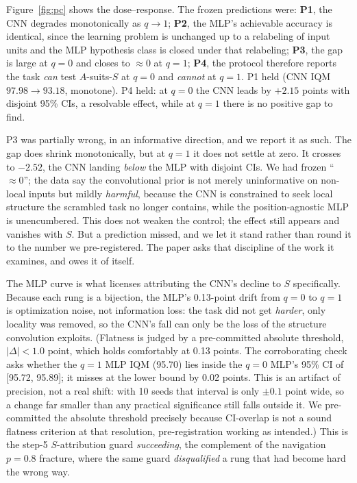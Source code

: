 \documentclass[10pt]{article}
\begin{document}
Figure~\ref{fig:pc} shows the dose--response. The frozen predictions were: \textbf{P1}, the
CNN degrades monotonically as $q \to 1$; \textbf{P2}, the MLP's achievable accuracy is
identical, since the learning problem is unchanged up to a relabeling of input units and the
MLP hypothesis class is closed under that relabeling; \textbf{P3}, the gap is large at $q=0$
and closes to ${\approx}0$ at $q=1$; \textbf{P4}, the protocol therefore reports the task
\emph{can} test $A$-suits-$S$ at $q=0$ and \emph{cannot} at $q=1$. P1 held (CNN IQM $97.98
\to 93.18$, monotone). P4 held: at $q=0$ the CNN leads by $+2.15$ points with
disjoint 95\% CIs, a resolvable effect, while at $q=1$ there is no positive gap to find.

P3 was partially wrong, in an informative direction, and we report it as such. The
gap does shrink monotonically, but at $q=1$ it does not settle at zero. It crosses to
$-2.52$, the CNN landing \emph{below} the MLP with disjoint CIs. We had frozen
``${\approx}0$''; the data say the convolutional prior is not merely uninformative on
non-local inputs but mildly \emph{harmful}, because the CNN is constrained to seek local
structure the scrambled task no longer contains, while the position-agnostic MLP is
unencumbered. This does not weaken the control; the effect still appears and vanishes with
$S$. But a prediction missed, and we let it stand rather than round it to the number we
pre-registered. The paper asks that discipline of the work it examines, and owes it of
itself.

The MLP curve is what licenses attributing the CNN's decline to $S$ specifically. Because
each rung is a bijection, the MLP's 0.13-point drift from $q=0$ to $q=1$ is
optimization noise, not information loss: the task did not get \emph{harder}, only locality
was removed, so the CNN's fall can only be the loss of the structure convolution exploits.
(Flatness is judged by a pre-committed absolute threshold, $|\Delta| < 1.0$ point, which
holds comfortably at 0.13 points. The corroborating check asks whether the $q=1$ MLP IQM
(95.70) lies inside the $q=0$ MLP's 95\% CI of [95.72, 95.89]; it misses at the lower bound
by 0.02 points. This is an artifact of precision, not a real shift: with 10 seeds that
interval is only ${\pm}0.1$ point wide, so a change far smaller than any practical
significance still falls outside it. We pre-committed the absolute threshold precisely
because CI-overlap is not a sound flatness criterion at that resolution, pre-registration
working as intended.) This is the step-5 $S$-attribution guard \emph{succeeding}, the
complement of the navigation $p=0.8$ fracture, where the same guard \emph{disqualified} a
rung that had become hard the wrong way.
\end{document}
